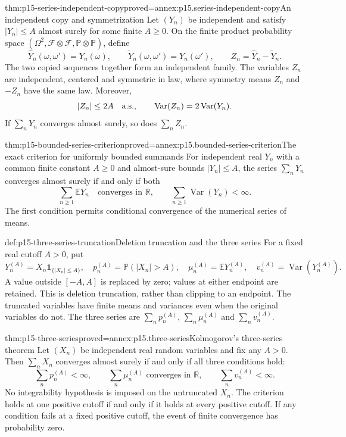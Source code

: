 \begin{hblemma}{thm:p15-series-independent-copy}{proved=annex:p15.series-independent-copy}{An independent copy and symmetrization}
Let \((Y_n)\) be independent and satisfy \(|Y_n|\leq A\) almost
surely for some finite \(A\geq0\). On the finite product probability
space \((\Omega^2,\mathcal F\otimes\mathcal F,
\mathbb P\otimes\mathbb P)\), define
\[
 \widehat Y_n(\omega,\omega')=Y_n(\omega),\qquad
 \widetilde Y_n(\omega,\omega')=Y_n(\omega'),\qquad
 Z_n=\widehat Y_n-\widetilde Y_n.
\]
The two copied sequences together form an independent family.
The variables \(Z_n\) are independent, centered and symmetric in
law, where symmetry means \(Z_n\) and \(-Z_n\) have the same law.
Moreover,
\[
 |Z_n|\leq2A\quad\hbox{a.s.},\qquad
 \operatorname{Var}(Z_n)=2\operatorname{Var}(Y_n).
\]
If \(\sum_nY_n\) converges almost surely, so does \(\sum_nZ_n\).
\end{hblemma}

\begin{hbtheorem}{thm:p15-bounded-series-criterion}{proved=annex:p15.bounded-series-criterion}{The exact criterion for uniformly bounded summands}
For independent real \(Y_n\) with a common finite constant \(A\geq0\)
and almost-sure bounds \(|Y_n|\leq A\), the series \(\sum_nY_n\) converges almost surely
if and only if both
\[
 \sum_{n\geq1}\mathbb EY_n\quad\text{converges in }\mathbb R,
 \qquad
 \sum_{n\geq1}\operatorname{Var}(Y_n)<\infty.
\]
The first condition permits conditional convergence of the numerical
series of means.
\end{hbtheorem}

\begin{hbdefinition}{def:p15-three-series-truncation}{Deletion truncation and the three series}
For a fixed real cutoff \(A>0\), put
\[
 Y_n^{(A)}=X_n\mathbf1_{\{|X_n|\leq A\}},\quad
 p_n^{(A)}=\mathbb P(|X_n|>A),\quad
 \mu_n^{(A)}=\mathbb EY_n^{(A)},\quad
 v_n^{(A)}=\operatorname{Var}(Y_n^{(A)}).
\]
A value outside \([-A,A]\) is replaced by zero; values at either
endpoint are retained. This is deletion truncation, rather than clipping
to an endpoint. The truncated variables have finite means and variances
even when the original variables do not. The three series are
\(\sum_np_n^{(A)}\), \(\sum_n\mu_n^{(A)}\) and
\(\sum_nv_n^{(A)}\).
\end{hbdefinition}

\begin{hbtheorem}{thm:p15-three-series}{proved=annex:p15.three-series}{Kolmogorov's three-series theorem}
Let \((X_n)\) be independent real random variables and fix any
\(A>0\). Then \(\sum_nX_n\) converges almost surely if and only if
all three conditions hold:
\[
 \sum_np_n^{(A)}<\infty,\qquad
 \sum_n\mu_n^{(A)}\text{ converges in }\mathbb R,\qquad
 \sum_nv_n^{(A)}<\infty.
\]
No integrability hypothesis is imposed on the untruncated \(X_n\).
The criterion holds at one positive cutoff if and only if it holds at
every positive cutoff. If any condition fails at a fixed positive
cutoff, the event of finite convergence has probability zero.
\end{hbtheorem}

